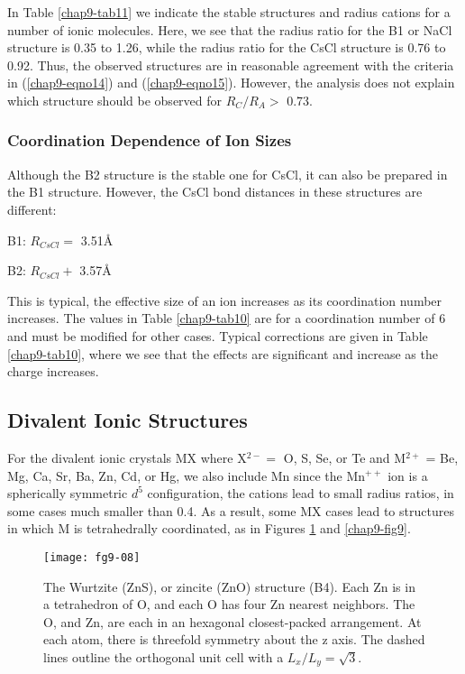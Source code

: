 In Table \ref{chap9-tab11} we indicate the stable structures and
radius cations for a number of ionic molecules.  Here, we see that the
radius ratio for the B1 or NaCl structure is 0.35 to 1.26, while the
radius ratio for the CsCl structure is 0.76 to 0.92.  Thus, the
observed structures are in reasonable agreement with the criteria in
(\ref{chap9-eqno14}) and (\ref{chap9-eqno15}).  However, the analysis
does not explain which structure should be observed for $R_C / R_A >$
0.73.

\subsubsection{Coordination Dependence of Ion Sizes}

Although the B2 structure is the stable one for CsCl, it can also be 
prepared in the B1 structure.  However, the CsCl bond distances in 
these structures are different:
\smallskip
\centerline{B1: $R_{CsCl} =$ 3.51\AA}
\centerline{B2: $R_{CsCl} +$ 3.57\AA}
\smallskip

\noindent
This is typical, the effective size of an ion increases as its
coordination number increases.  The values in Table \ref{chap9-tab10}
are for a coordination number of 6 and must be modified for other
cases.  Typical corrections are given in Table \ref{chap9-tab10},
where we see that the effects are significant and increase as the
charge increases.

\subsection{Divalent Ionic Structures}

For the divalent ionic crystals MX where X$^{2-} =$ O, S, Se, or Te
and M$^{2+}$ = Be, Mg, Ca, Sr, Ba, Zn, Cd, or Hg, we also include Mn
since the Mn$^{++}$ ion is a spherically symmetric $d^5$
configuration, the cations lead to small radius ratios, in some cases
much smaller than 0.4.  As a result, some MX cases lead to structures
in which M is tetrahedrally coordinated, as in Figures
\ref{chap9-fig8} and \ref{chap9-fig9}.


\begin{figure}
\texttt{[image: fg9-08]}
\caption{The Wurtzite (ZnS), or zincite (ZnO) 
structure (B4). Each Zn is in a tetrahedron of O, and each O has four
Zn nearest neighbors.  The O, and Zn, are each in an hexagonal
closest-packed arrangement.  At each atom, there is threefold symmetry
about the z axis. The dashed lines outline the orthogonal unit cell
with a $L_x/L_y = \sqrt{3}$.}
\label{chap9-fig8}
\end{figure}

